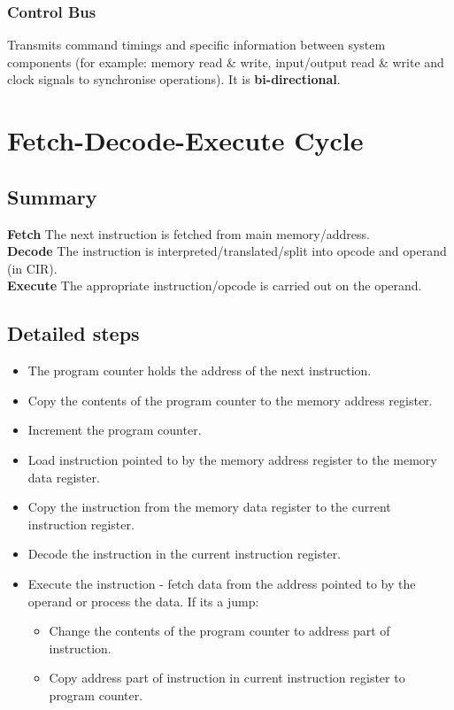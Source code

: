 \documentclass[a4paper,11pt, twocolumn]{article}
\begin{document}
\subsubsection{Control Bus}
Transmits command timings and specific information between system components (for example: memory read \& write, input/output read \& write and clock signals to synchronise operations). It is \textbf{bi-directional}.

\section{Fetch-Decode-Execute Cycle}
\subsection{Summary}
\textbf{Fetch} The next instruction is fetched from main memory/address.\\
\textbf{Decode} The instruction is interpreted/translated/split into opcode and operand (in CIR).\\
\textbf{Execute} The appropriate instruction/opcode is carried out on the operand.
\subsection{Detailed steps}
\begin{itemize}
    \item The program counter holds the address of the next instruction.
    \item Copy the contents of the program counter to the memory address register.
    \item Increment the program counter.
    \item Load instruction pointed to by the memory address register to the memory data register.
    \item Copy the instruction from the memory data register to the current instruction register.
    \item Decode the instruction in the current instruction register.
    \item Execute the instruction - fetch data from the address pointed to by the operand or process the data. If its a jump:
    \begin{itemize}
        \item Change the contents of the program counter to address part of instruction.
        \item Copy address part of instruction in current instruction register to program counter.
    \end{itemize}
\end{itemize}
\end{document}
